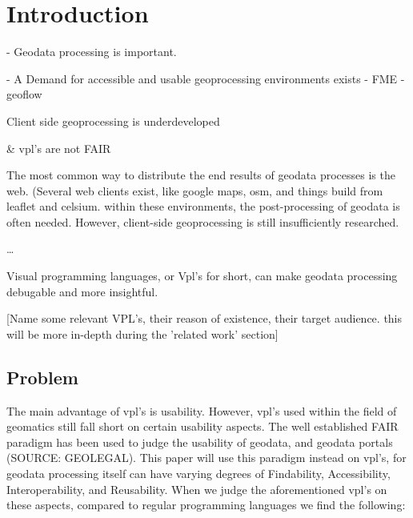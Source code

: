 \section{Introduction}

\par


- Geodata processing is important.

- A Demand for accessible and usable geoprocessing environments exists
  - FME
  - geoflow
  

Client side geoprocessing is underdeveloped 


\& vpl's are not FAIR 


The most common way to distribute the end results of geodata processes is the web. 
(Several web clients exist, like google maps, osm, and things build from leaflet and celsium. 
within these environments, the post-processing of geodata is often needed. 
However, client-side geoprocessing is still insufficiently researched.






\dots




\par
Visual programming languages, or Vpl's for short, can make geodata processing debugable and more insightful. 

[Name some relevant VPL's, their reason of existence, their target audience.
this will be more in-depth during the 'related work' section] 


\subsection{Problem}
The main advantage of vpl's is usability. 
However, vpl's used within the field of geomatics still fall short on certain usability aspects. 
The well established FAIR paradigm has been used to judge the usability of geodata, and geodata portals (SOURCE: GEOLEGAL). 
This paper will use this paradigm instead on vpl's, for geodata processing itself can have varying degrees of Findability, Accessibility, Interoperability, and Reusability. 
When we judge the aforementioned vpl's on these aspects, compared to regular programming languages we find the following: 


